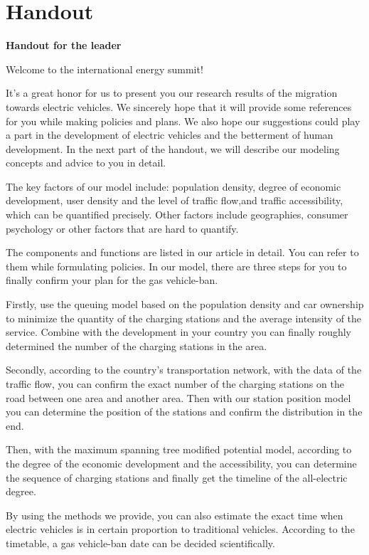 \documentclass[12pt]{article}  %
\begin{document}
\clearpage
\section{Handout}
\begin{center}
	\textbf{Handout for the leader}
\end{center}

Welcome to the international energy summit!

It’s a great honor for us to present you our research results of the migration towards electric vehicles. We sincerely hope that it will provide some references for you while making policies and plans. We also hope our suggestions could play a part in the development of electric vehicles and the betterment of human development. In the next part of the handout, we will describe our modeling concepts and advice to you in detail.

The key factors of our model include: population density, degree of economic development, user density and the level of traffic flow,and traffic accessibility, which can be quantified precisely. Other factors include geographies, consumer psychology or other factors that are hard to quantify.

The components and functions are listed in our article in detail. You can refer to them while formulating policies. In our model, there are three steps for you to finally confirm your plan for the gas vehicle-ban.

Firstly, use the queuing model based on the population density and car ownership to minimize the quantity of the charging stations and the average intensity of the service. Combine with the development in your country you can finally roughly determined the number of the charging stations in the area.

Secondly, according to the country’s transportation network, with the data of the traffic flow, you can confirm the exact number of the charging stations on the road between one area and another area. Then with our station position model you can determine the position of the stations and confirm the distribution in the end.

Then, with the maximum spanning tree modified potential model, according to the degree of the economic development and the accessibility, you can determine the sequence of charging stations and finally get the timeline of the all-electric degree.

By using the methods we provide, you can also estimate the exact time when electric vehicles is in certain proportion to traditional vehicles. According to the timetable, a gas vehicle-ban date can be decided scientifically.
\end{document}
